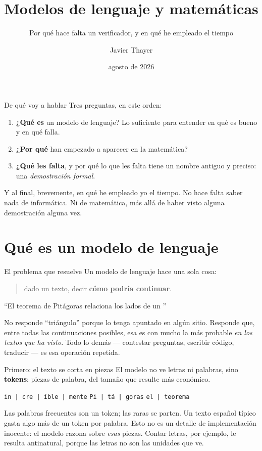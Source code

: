 \documentclass[11pt,aspectratio=169]{beamer}
\title[Modelos de lenguaje y matemáticas]%
      {Modelos de lenguaje y matemáticas}
\subtitle{Por qué hace falta un verificador, y en qué he empleado el tiempo}
\author{Javier Thayer}
\date{agosto de 2026}
\begin{document}
\begin{frame}
  \titlepage
\end{frame}

\begin{frame}{De qué voy a hablar}
  Tres preguntas, en este orden:
  \begin{enumerate}
    \item \textbf{¿Qué es} un modelo de lenguaje? Lo suficiente para entender
          en qué es bueno y en qué falla.
    \item \textbf{¿Por qué} han empezado a aparecer en la matemática?
    \item \textbf{¿Qué les falta}, y por qué lo que les falta tiene un nombre
          antiguo y preciso: una \emph{demostración formal}.
  \end{enumerate}
  \vfill
  Y al final, brevemente, en qué he empleado yo el tiempo.
  \vfill
  {\small No hace falta saber nada de informática. Ni de matemática, más allá
   de haber visto alguna demostración alguna vez.}
\end{frame}

\section{Qué es un modelo de lenguaje}

\begin{frame}{El problema que resuelve}
  Un modelo de lenguaje hace una sola cosa:
  \begin{quote}
    dado un texto, decir \textbf{cómo podría continuar}.
  \end{quote}
  \vfill
  \begin{center}
    \large
    ``El teorema de Pitágoras relaciona los lados de un \underline{\hspace{3em}}''
  \end{center}
  \vfill
  No responde ``triángulo'' porque lo tenga apuntado en algún sitio. Responde
  que, entre todas las continuaciones posibles, esa es con mucho la más
  probable \emph{en los textos que ha visto}.
  \vfill
  Todo lo demás --- contestar preguntas, escribir código, traducir --- es esa
  operación repetida.
\end{frame}

\begin{frame}{Primero: el texto se corta en piezas}
  El modelo no ve letras ni palabras, sino \textbf{tokens}: piezas de palabra,
  del tamaño que resulte más económico.
  \vfill
  \begin{center}
    \large
    \texttt{in\,|\,cre\,|\,íble\,|\,mente} \qquad
    \texttt{Pi\,|\,tá\,|\,goras} \qquad
    \texttt{el\,|\,teorema}
  \end{center}
  \vfill
  Las palabras frecuentes son un token; las raras se parten. Un texto español
  típico gasta algo más de un token por palabra.
  \vfill
  Esto no es un detalle de implementación inocente: el modelo razona sobre
  \emph{esas} piezas. Contar letras, por ejemplo, le resulta antinatural, porque
  las letras no son las unidades que ve.
\end{frame}
\end{document}
